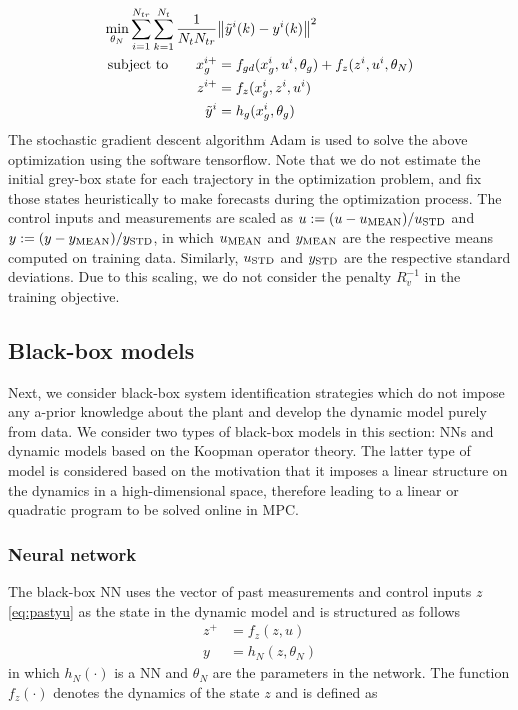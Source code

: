 \documentclass[10pt]{article}
\begin{document}
\begin{align} \label{eq:hybrid_training}
  \underset{\theta_N}{\textnormal{min}} \sum_{i=1}^{N_{tr}} \sum_{k=1}^{N_t} 
  \dfrac{1}{N_tN_{tr}} &\norm{\tilde{y}^i(k) - y^i(k)}^2  \\
  \textnormal{subject to} \quad \quad x_g^{i+} &= f_{gd}(x_g^i, u^i, \theta_g) + f_z(z^i, u^i, \theta_N) \nonumber \\
  z^{i+} &= f_z(x_g^i, z^i, u^i) \nonumber \\
   \tilde{y}^i &= h_g(x_g^i, \theta_g) \nonumber
\end{align}
The stochastic gradient descent algorithm Adam is used to solve the above
optimization using the software tensorflow. Note that we do not estimate the
initial grey-box state for each trajectory in the optimization problem, and fix
those states heuristically to make forecasts during the optimization process.
The control inputs and measurements are scaled as $u := (u -
u_{\textnormal{MEAN}})/u_{\textnormal{STD}}$ and $y := (y -
y_{\textnormal{MEAN}})/y_{\textnormal{STD}}$, in which $u_{\textnormal{MEAN}}$
and $y_{\textnormal{MEAN}}$ are the respective means computed on training data.
Similarly, $u_{\textnormal{STD}}$ and $y_{\textnormal{STD}}$ are the respective
standard deviations. Due to this scaling, we do not consider the penalty
$R_v^{-1}$ in the training objective.

\subsection{Black-box models}
Next, we consider black-box system identification strategies which do not impose
any a-prior knowledge about the plant and develop the dynamic model purely from
data. We consider two types of black-box models in this section: NNs and dynamic
models based on the Koopman operator theory. The latter type of model is
considered based on the motivation that it imposes a linear structure on the
dynamics in a high-dimensional space, therefore leading to a linear or quadratic
program to be solved online in MPC.

\subsubsection{Neural network}
The black-box NN uses the vector of past measurements and control inputs $z$
\eqref{eq:pastyu} as the state in the dynamic model and is structured as follows
\begin{align} \label{eq:bbnn_model}
  z^+ &= f_z(z, u) \\ 
  y &= h_N(z, \theta_N) \nonumber
\end{align}
in which $h_N(\cdot)$ is a NN and $\theta_N$ are the parameters in the network.
The function $f_z(\cdot)$ denotes the dynamics of the state $z$ and is defined
as 
\end{document}
